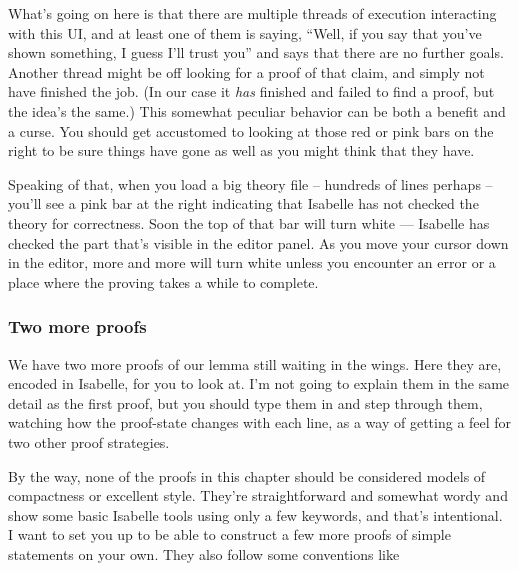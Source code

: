 What's going on here is that there are multiple threads of execution interacting with this UI, and at least one of them is saying, ``Well, if you say that you've shown something, I guess I'll trust you'' and says that there are no further goals. Another thread might be off looking for a proof of that claim, and simply not have finished the job. (In our case it \textit{has} finished and failed to find a proof, but the idea's the same.) This somewhat peculiar behavior can be both a benefit and a curse. You should get accustomed to looking at those red or pink bars on the right to be sure things have gone as well as you might think that they have. 

Speaking of that, when you load a big theory file -- hundreds of lines perhaps -- you'll see a pink bar at the right indicating that Isabelle has not checked the theory for correctness. Soon the top of that bar will turn white --- Isabelle has checked the part that's visible in the editor panel. As you move your cursor down in the editor, more and more will turn white unless you encounter an error or a place where the proving takes a while to complete. 

\subsubsection{Two more proofs}

We have two more proofs of our lemma still waiting in the wings. Here they are, encoded in Isabelle, for you to look at. I'm not going to explain them in the same detail as the first proof, but you should type them in and step through them, watching how the proof-state changes with each line, as a way of getting a feel for two other proof strategies. 

By the way, none of the proofs in this chapter should be considered models of compactness or excellent style. They're straightforward and somewhat wordy and show some basic Isabelle tools using only a few keywords, and that's intentional. I want to set you up to be able to construct a few more proofs of simple statements on your own. They also follow some conventions like 

